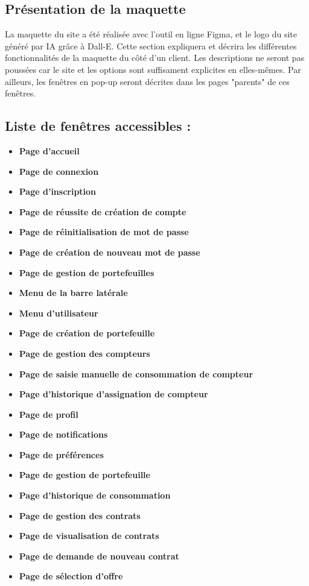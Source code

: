 \documentclass[../rapport.tex]{subfiles}
\begin{document}
\subsection{Présentation de la maquette}
La maquette du site a été réalisée avec l'outil en ligne Figma, et le logo du site généré par IA grâce à Dall-E.
Cette section expliquera et décrira les différentes fonctionnalités de la maquette du côté d'un client. Les descriptions ne seront pas poussées car le site et les options sont suffisament explicites en elles-mêmes. Par ailleurs, les fenêtres en pop-up seront décrites dans les pages "parents" de ces fenêtres.

\subsection{Liste de fenêtres accessibles : }

\begin{itemize}
    \item \textbf{Page d'accueil}
    \item \textbf{Page de connexion}
    \item \textbf{Page d'inscription}
    \item \textbf{Page de réussite de création de compte}
    \item \textbf{Page de réinitialisation de mot de passe}
    \item \textbf{Page de création de nouveau mot de passe}
    \item \textbf{Page de gestion de portefeuilles}
    \item \textbf{Menu de la barre latérale}
    \item \textbf{Menu d'utilisateur}
    \item \textbf{Page de création de portefeuille}
    \item \textbf{Page de gestion des compteurs}
    \item \textbf{Page de saisie manuelle de consommation de compteur}
    \item \textbf{Page d'historique d'assignation de compteur}
    \item \textbf{Page de profil}
    \item \textbf{Page de notifications}
    \item \textbf{Page de préférences}
    \item \textbf{Page de gestion de portefeuille}
    \item \textbf{Page d'historique de consommation}
    \item \textbf{Page de gestion des contrats}
    \item \textbf{Page de visualisation de contrats}
    \item \textbf{Page de demande de nouveau contrat}
    \item \textbf{Page de sélection d'offre}
\end{itemize}
 
\end{document}
